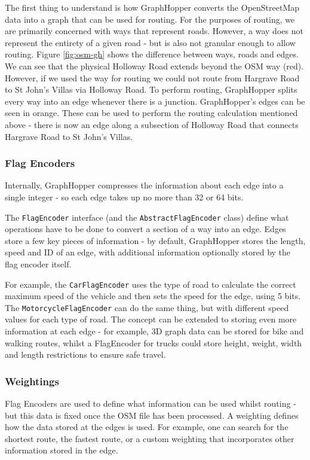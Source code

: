 \documentclass[ %
                    author={Alexander Hill},
                supervisor={Dr. Benjamin Sach},
                    degree={MEng},
                     title={MARMOSET},
                  subtitle={Multi-Agent Route Management using Online Simulation for Efficient Transportation},
                      type={research},
                      year={2016} ]{dissertation}
\begin{document}
The first thing to understand is how GraphHopper converts the OpenStreetMap data
into a graph that can be used for routing.  For the purposes of routing, we are
primarily concerned with ways that represent roads. However, a way does not
represent the entirety of a given road - but is also not granular enough to
allow routing. Figure \ref{fig:osm-gh} shows the difference between ways, roads
and edges. We can see that the physical Holloway Road extends beyond the OSM way
(red). However, if we used the way for routing we could not route from Hargrave
Road to St John's Villas via Holloway Road. To perform routing, GraphHopper
splits every way into an edge whenever there is a junction. GraphHopper's edges
can be seen in orange. These can be used to perform the routing calculation
mentioned above - there is now an edge along a subsection of Holloway Road that
connects Hargrave Road to St John's Villas.

\subsubsection{Flag Encoders}

Internally, GraphHopper compresses the information about each edge into a single
integer - so each edge takes up no more than 32 or 64 bits.

The \texttt{FlagEncoder} interface (and the \texttt{AbstractFlagEncoder} class)
define what operations have to be done to convert a section of a way into an
edge. Edges store a few key pieces of information - by default, GraphHopper
stores the length, speed and ID of an edge, with additional information
optionally stored by the flag encoder itself.

For example, the \texttt{CarFlagEncoder} uses the type of road to calculate the
correct maximum speed of the vehicle and then sets the speed for the edge, using
5 bits. The \texttt{MotorcycleFlagEncoder} can do the same thing, but with
different speed values for each type of road. The concept can be extended to
storing even more information at each edge - for example, 3D graph data can be
stored for bike and walking routes, whilst a FlagEncoder for trucks could store
height, weight, width and length restrictions to ensure safe travel.

\subsubsection{Weightings}\label{sec:gh-weighting}

Flag Encoders are used to define what information can be used whilst routing -
but this data is fixed once the OSM file has been processed. A weighting defines
how the data stored at the edges is used. For example, one can search for the
shortest route, the fastest route, or a custom weighting that incorporates other
information stored in the edge.
\end{document}
